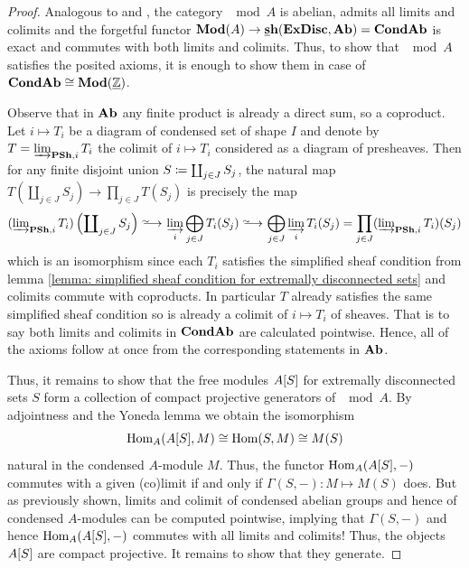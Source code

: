 \begin{proof}
	Analogous to \cite[\href{https://stacks.math.columbia.edu/tag/03DA}{Tag 03DA}]{stacks-project} and \cite[\href{https://stacks.math.columbia.edu/tag/03DB}{Tag 03DB}]{stacks-project}, the category $\mod{A}$ is abelian, admits all limits and colimits and the forgetful functor $\mod{A}\to\smallSheaves{\extremallyDisconnectedSets}{\Ab}=\condensedAb$ is exact and commutes with both limits and colimits. Thus, to show that $\mod{A}$ satisfies the posited axioms, it is enough to show them in case of ${{{\mathbf{Cond}}}{{\mathbf{Ab}}}} \cong {{\mathbf{Mod}}(\underline{{\mathbb{Z}}})}$.
	
	Observe that in ${{\mathbf{Ab}}}$ any finite product is already a direct sum, so a coproduct. Let $i\mapsto T_i$ be a diagram of condensed set of shape $I$ and denote by $T = \varinjlim_{{{\mathbf{PSh}}}, i} T_i$ the colimit of $i\mapsto T_i$ considered as a diagram of presheaves. Then for any finite disjoint union $S \coloneqq \coprod_{j\in J} S_j$, the natural map $T(\coprod_{j\in J} S_j) \to \prod_{j\in J} T(S_j)$ is precisely the map
		$$(\colimit\nolimits_{\preSheavesSymbol, i} T_i)\left(\coprod\nolimits_{j\in J} S_j\right) \isorightarrow \colimit_i \bigoplus_{j\in J} T_i(S_j) \isorightarrow \bigoplus_{j\in J} \colimit_i T_i(S_j)=\prod_{j\in J} (\colimit\nolimits_{\preSheavesSymbol, i} T_i)(S_j)$$
	which is an isomorphism since each $T_i$ satisfies the simplified sheaf condition from lemma \ref{lemma: simplified sheaf condition for extremally disconnected sets} and colimits commute with coproducts. In particular $T$ already satisfies the same simplified sheaf condition so is already a colimit of $i\mapsto T_i$ of sheaves. That is to say both limits and colimits in ${{{\mathbf{Cond}}}{{\mathbf{Ab}}}}$ are calculated pointwise. Hence, all of the axioms follow at once from the corresponding statements in ${{\mathbf{Ab}}}$.
	
	Thus, it remains to show that the free modules ${A[S]}$ for extremally disconnected sets $S$ form a collection of compact projective generators of $\mod{A}$. By adjointness and the Yoneda lemma we obtain the isomorphism
		$${\operatorname{Hom}}_A({A[S]}, M)\cong {\operatorname{Hom}}(S, M) \cong M(S)$$
	natural in the condensed $A$-module $M$. Thus, the functor ${\operatorname{Hom}}_A({A[S]}, -)$ commutes with a given (co)limit if and only if $\Gamma(S, -)\colon M\mapsto M(S)$ does. But as previously shown, limits and colimit of condensed abelian groups and hence of condensed $A$-modules can be computed pointwise, implying that $\Gamma(S, -)$ and hence ${\operatorname{Hom}}_A({A[S]}, -)$ commutes with all limits and colimits! Thus, the objects ${A[S]}$ are compact projective. It remains to show that they generate.
	

\end{proof}
